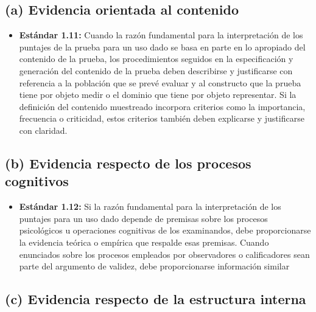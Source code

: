 \documentclass[
  letterpaper,
  DIV=11,
  numbers=noendperiod]{scrreprt}
\providecommand{\tightlist}{%
  \setlength{\itemsep}{0pt}\setlength{\parskip}{0pt}}
\begin{document}
\subsection{(a) Evidencia orientada al
contenido}\label{a-evidencia-orientada-al-contenido}

\begin{itemize}
\tightlist
\item
  \textbf{Estándar 1.11:} Cuando la razón fundamental para la
  interpretación de los puntajes de la prueba para un uso dado se basa
  en parte en lo apropiado del contenido de la prueba, los
  procedimientos seguidos en la especificación y generación del
  contenido de la prueba deben describirse y justificarse con referencia
  a la población que se prevé evaluar y al constructo que la prueba
  tiene por objeto medir o el dominio que tiene por objeto representar.
  Si la definición del contenido muestreado incorpora criterios como la
  importancia, frecuencia o criticidad, estos criterios también deben
  explicarse y justificarse con claridad.
\end{itemize}

\subsection{(b) Evidencia respecto de los procesos
cognitivos}\label{b-evidencia-respecto-de-los-procesos-cognitivos}

\begin{itemize}
\tightlist
\item
  \textbf{Estándar 1.12:} Si la razón fundamental para la interpretación
  de los puntajes para un uso dado depende de premisas sobre los
  procesos psicológicos u operaciones cognitivas de los examinandos,
  debe proporcionarse la evidencia teórica o empírica que respalde esas
  premisas. Cuando enunciados sobre los procesos empleados por
  observadores o calificadores sean parte del argumento de validez, debe
  proporcionarse información similar
\end{itemize}

\subsection{(c) Evidencia respecto de la estructura
interna}\label{c-evidencia-respecto-de-la-estructura-interna}
\end{document}
